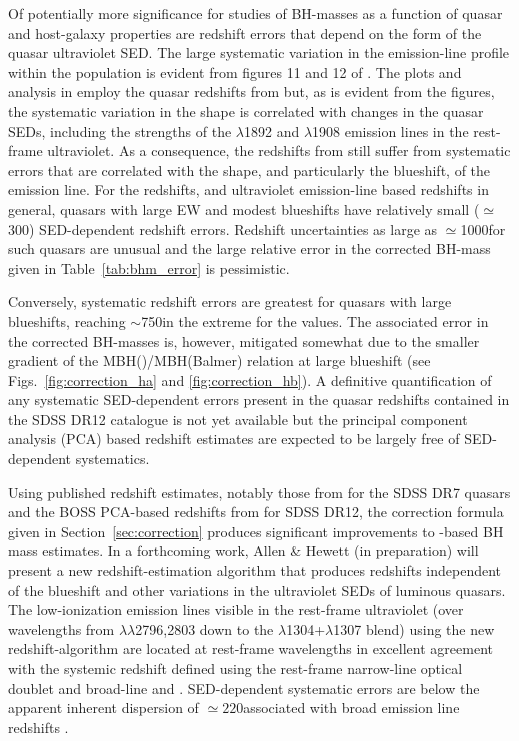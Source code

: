 Of potentially more significance for studies of BH-masses as a function of quasar and host-galaxy properties are redshift errors that depend on the form of the quasar ultraviolet SED.
The large systematic variation in the  emission-line profile within the population is evident from figures 11 and 12 of \citet{richards11}. 
The plots and analysis in \citet{richards11} employ the quasar redshifts from \citet{hewett10} but, as is evident from the figures, the systematic variation in the  shape is correlated with changes in the quasar SEDs, including the strengths of the $\lambda$1892 and $\lambda$1908 emission lines in the rest-frame ultraviolet. 
As a consequence, the redshifts from \citet{hewett10} still suffer from systematic errors that are correlated with the shape, and particularly the blueshift, of the  emission line.
For the \citet{hewett10} redshifts, and ultraviolet emission-line based redshifts in general, quasars with large  EW and modest blueshifts have relatively small ($\simeq$300\kms) SED-dependent redshift errors.
Redshift uncertainties as large as $\simeq$1000\kms for such quasars are unusual and the large relative error in the corrected  BH-mass given in Table~\ref{tab:bhm_error} is pessimistic. 

Conversely, systematic redshift errors are greatest for quasars with large blueshifts, reaching $\sim$750\kms in the extreme for the \citet{hewett10} values. 
The associated error in the corrected  BH-masses is, however, mitigated somewhat due to the smaller gradient of the MBH()/MBH(Balmer) relation at large  blueshift (see Figs.~\ref{fig:correction_ha} and \ref{fig:correction_hb}). 
A definitive quantification of any systematic SED-dependent errors present in the quasar redshifts contained in the SDSS DR12 catalogue is not yet available but the principal component analysis (PCA) based redshift estimates are expected to be largely free of SED-dependent systematics. 

Using published redshift estimates, notably those from \citet{hewett10} for the SDSS DR7 quasars and the BOSS PCA-based redshifts from \citet{paris17} for SDSS DR12, the correction formula given in Section~\ref{sec:correction} produces significant improvements to -based BH mass estimates.
In a forthcoming work, Allen \& Hewett (in preparation) will present a new redshift-estimation algorithm that produces redshifts independent of the  blueshift and other variations in the ultraviolet SEDs of luminous quasars.
The low-ionization emission lines visible in the rest-frame ultraviolet (over wavelengths from $\lambda\lambda$2796,2803 down to the $\lambda$1304+$\lambda$1307 blend) using the new redshift-algorithm are located at rest-frame wavelengths in excellent agreement with the systemic redshift defined using the rest-frame narrow-line optical  doublet and broad-line \hb and \hans.
SED-dependent systematic errors are below the apparent inherent dispersion of $\simeq220$\kms associated with broad emission line redshifts \citep{shen16b}.

